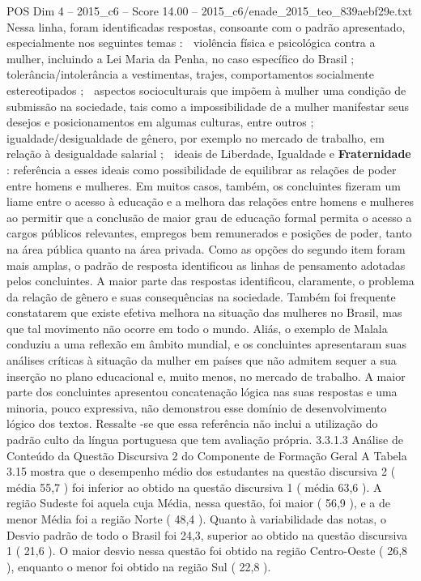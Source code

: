 \begin{textsample}{POS Dim 4 – 2015\_c6 – Score 14.00 – 2015\_c6/enade\_2015\_teo\_839aebf29e.txt}
Nessa linha, foram identificadas respostas, consoante com o padrão apresentado, especialmente nos seguintes temas :  violência física e psicológica contra a mulher, incluindo a Lei Maria da Penha, no caso específico do Brasil ;  tolerância/intolerância a vestimentas, trajes, comportamentos socialmente estereotipados ;  aspectos socioculturais que impõem à mulher uma condição de submissão na sociedade, tais como a impossibilidade de a mulher manifestar seus desejos e posicionamentos em algumas culturas, entre outros ;  igualdade/desigualdade de gênero, por exemplo no mercado de trabalho, em relação à desigualdade salarial ;  ideais de Liberdade, Igualdade e \textbf{Fraternidade} : referência a esses ideais como possibilidade de equilibrar as relações de poder entre homens e mulheres.
Em muitos casos, também, os concluintes fizeram um liame entre o acesso à educação e a melhora das relações entre homens e mulheres ao permitir que a conclusão de maior grau de educação formal permita o acesso a cargos públicos relevantes, empregos bem remunerados e posições de poder, tanto na área pública quanto na área privada.
Como as opções do segundo item foram mais amplas, o padrão de resposta identificou as linhas de pensamento adotadas pelos concluintes.
A maior parte das respostas identificou, claramente, o problema da relação de gênero e suas consequências na sociedade.
Também foi frequente constatarem que existe efetiva melhora na situação das mulheres no Brasil, mas que tal movimento não ocorre em todo o mundo.
Aliás, o exemplo de Malala conduziu a uma reflexão em âmbito mundial, e os concluintes apresentaram suas análises críticas à situação da mulher em países que não admitem sequer a sua inserção no plano educacional e, muito menos, no mercado de trabalho.
A maior parte dos concluintes apresentou concatenação lógica nas suas respostas e uma minoria, pouco expressiva, não demonstrou esse domínio de desenvolvimento lógico dos textos.
Ressalte -se que essa referência não inclui a utilização do padrão culto da língua portuguesa que tem avaliação própria. 3.3.1.3 Análise de Conteúdo da Questão Discursiva 2 do Componente de Formação Geral A Tabela 3.15 mostra que o desempenho médio dos estudantes na questão discursiva 2 ( média 55,7 ) foi inferior ao obtido na questão discursiva 1 ( média 63,6 ).
A região Sudeste foi aquela cuja Média, nessa questão, foi maior ( 56,9 ), e a de menor Média foi a região Norte ( 48,4 ).
Quanto à variabilidade das notas, o Desvio padrão de todo o Brasil foi 24,3, superior ao obtido na questão discursiva 1 ( 21,6 ).
O maior desvio nessa questão foi obtido na região Centro-Oeste ( 26,8 ), enquanto o menor foi obtido na região Sul ( 22,8 ).

\end{textsample}
